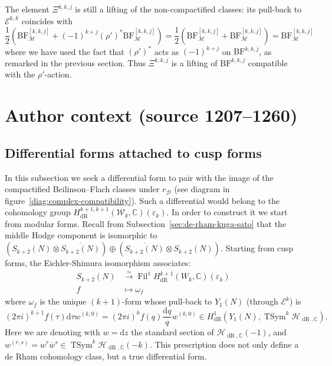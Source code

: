 \documentclass[10pt,a4paper]{amsart}
\newcommand{\BF}{\mathrm{BF}}
\newcommand{\Ell}{\mathcal{E}}
\newcommand{\KS}{\mathscr{W}}
\newcommand{\cBF}{\Xi}
\newcommand{\regulator}[1]{r_{#1}}
\newcommand{\C}{\numberset{C}}
\DeclareMathOperator{\Fil}{Fil}
\newcommand{\HS}{\mathscr{H}}
\DeclareMathOperator{\TSym}{TSym}
\DeclareMathOperator{\dR}{dR}
\newcommand{\del}{\mathcal{D}}
\renewcommand{\epsilon}{\varepsilon}
\DeclareMathOperator{\mot}{\mathscr{M}}
\newcommand{\rD}{\regulator{\del}}
\newcommand{\ud}{\mathrm{d}}
\newcommand{\numberset}{\mathbb}
\begin{document}
 The element $\cBF^{k,k,j}$ is still a lifting of the non-compactified classes: its pull-back to $\Ell^{k,k}$ coincides with
 \[
  \frac{1}{2}(\BF^{[k,k,j]}_{\mot} + (-1)^{k+j}(\rho')^*\BF^{[k,k,j]}_{\mot}) = \frac{1}{2}(\BF^{[k,k,j]}_{\mot} + \BF^{[k,k,j]}_{\mot}) = \BF^{[k,k,j]}_{\mot}
 \]
 where we have used the fact that $(\rho')^*$ acts as $(-1)^{k+j}$ on $\BF^{k,k,j}$, as remarked in the previous section. Thus $\cBF^{k,k,j}$ is a lifting of $\BF^{k,k,j}$ compatible with the $\rho'$-action.


\section*{Author context (source 1207--1260)}
\subsection{Differential forms attached to cusp forms}
\label{subsec:differential-forms}

 In this subsection we seek a differential form to pair with the image of the compactified Beilinson--Flach classes under $\rD$ (see diagram in figure~\ref{diag:complex-compatibility}). Such a differential would belong to the cohomology group $H^{k+1,k+1}_{\dR}(\KS_k, \C)(\epsilon_k)$. In order to construct it we start from modular forms. Recall from Subsection~\ref{sec:de-rham-kuga-sato} that the middle Hodge component is isomorphic to $(S_{k+2}(N)\otimes \overline{S_{k+2}(N)}) \oplus (\overline{S_{k+2}(N)} \otimes S_{k+2}(N))$. Starting from cusp forms, the Eichler-Shimura isomorphism associates:
 \begin{align*}
     S_{k+2}(N) &\xrightarrow{\simeq} \Fil^1 H^{k+1}_{\dR}(W_k,\C)(\epsilon_k) \\
     f &\mapsto \omega_f
 \end{align*}
 where $\omega_f$ is the unique $(k+1)$-form whose pull-back to $Y_1(N)$ (through $\Ell^k$) is
 \[
     (2\pi i)^{k+1} f(\tau)\ud\tau w^{(k,0)} = (2\pi i)^k f(q) \frac{\ud q}{q} w^{(k,0)} \in H^{1}_{\dR}(Y_1(N),\TSym^k \HS_{\dR,\C}).
 \]
 Here we are denoting with $w = \ud z$ the standard section of $\HS_{\dR, \C}(-1)$, and $w^{(r,s)} = w^r \overline{w}^s \in \TSym^k \HS_{\dR, \C}(-k)$. This prescription does not only define a de Rham cohomology class, but a true differential form.
\end{document}
